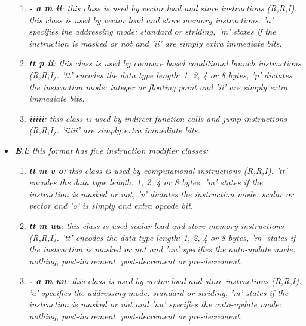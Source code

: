 \begin{itemize}
\begin{enumerate}
                        \item \textit{\textbf{- a m ii}: this class is used by vector load and store instructions (R,R,I). this class is used by vector load and store memory instructions. 'a' specifies the addressing mode: standard or striding, 'm' states if the instruction is masked or not and 'ii' are simply extra immediate bits.}

                        \item \textit{\textbf{tt p ii}: this class is used by compare based conditional branch instructions (R,R,I). 'tt' encodes the data type length: 1, 2, 4 or 8 bytes, 'p' dictates the instruction mode: integer or floating point and 'ii' are simply extra immediate bits.}

                        \item \textit{\textbf{iiiii}: this class is used by indirect function calls and jump instructions (R,R,I). 'iiiii' are simply extra immediate bits.}

                    \end{enumerate}

                \item \textit{\textbf{E.l}: this format has five instruction modifier classes:}

                    \begin{enumerate}

                        \item \textit{\textbf{tt m v o}: this class is used by computational instructions (R,R,I). 'tt' encodes the data type length: 1, 2, 4 or 8 bytes, 'm' states if the instruction is masked or not, 'v' dictates the instruction mode: scalar or vector and 'o' is simply and extra opcode bit.}

                        \item \textit{\textbf{tt m uu}: this class is used scalar load and store memory instructions (R,R,I). 'tt' encodes the data type length: 1, 2, 4 or 8 bytes, 'm' states if the instruction is masked or not and 'uu' specifies the auto-update mode: nothing, post-increment, post-decrement or pre-decrement.}

                        \item \textit{\textbf{- a m uu}: this class is used by vector load and store instructions (R,R,I). 'a' specifies the addressing mode: standard or striding, 'm' states if the instruction is masked or not and 'uu' specifies the auto-update mode: nothing, post-increment, post-decrement or pre-decrement.}


\end{enumerate}
\end{itemize}

